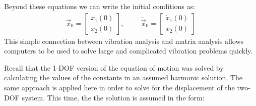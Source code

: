 \documentclass[12pt,letter]{article}
\numberwithin{ex}{section} %
\numberwithin{re}{section} %
\begin{document}
Beyond these equations we can write the initial conditions as:
\begin{eqnarray}
\vec{x}_0=  \begin{bmatrix} x_1(0) \\  x_2(0) \end{bmatrix},  \hspace{1cm} \dot{\vec{x}}_0=  \begin{bmatrix} \dot{x}_1(0) \\  \dot{x}_2(0) \end{bmatrix}
\end{eqnarray}
This simple connection between vibration analysis and matrix analysis allows computers to be used to solve large and complicated vibration problems quickly.

Recall that the 1-DOF version of the equation of motion was solved by calculating the values of the constants in an assumed harmonic solution. The same approach is applied here in order to solve for the displacement of the two-DOF system. This time, the the solution is assumed in the form:
\end{document}
